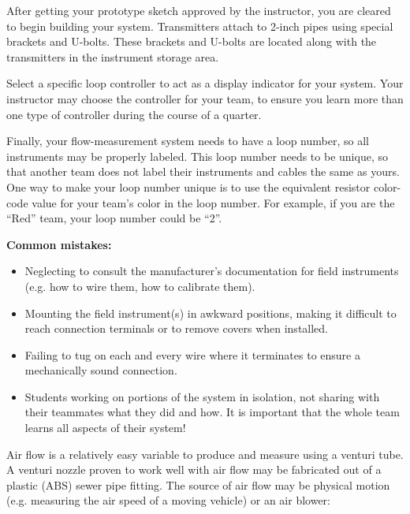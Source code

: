 \begin{itemize}
After getting your prototype sketch approved by the instructor, you are cleared to begin building your system.  Transmitters attach to 2-inch pipes using special brackets and U-bolts.  These brackets and U-bolts are located along with the transmitters in the instrument storage area.  

Select a specific loop controller to act as a display indicator for your system.  Your instructor may choose the controller for your team, to ensure you learn more than one type of controller during the course of a quarter.

Finally, your flow-measurement system needs to have a loop number, so all instruments may be properly labeled.  This loop number needs to be unique, so that another team does not label their instruments and cables the same as yours.  One way to make your loop number unique is to use the equivalent resistor color-code value for your team's color in the loop number.  For example, if you are the ``Red'' team, your loop number could be ``2''. 

\vskip 10pt

{\bf Common mistakes:}

\begin{itemize}
\item{} Neglecting to consult the manufacturer's documentation for field instruments (e.g. how to wire them, how to calibrate them).
\item{} Mounting the field instrument(s) in awkward positions, making it difficult to reach connection terminals or to remove covers when installed.
\item{} Failing to tug on each and every wire where it terminates to ensure a mechanically sound connection.
\item{} Students working on portions of the system in isolation, not sharing with their teammates what they did and how.  It is important that the whole team learns all aspects of their system!
\end{itemize}

\vfil \eject

Air flow is a relatively easy variable to produce and measure using a venturi tube.  A venturi nozzle proven to work well with air flow may be fabricated out of a plastic (ABS) sewer pipe fitting.  The source of air flow may be physical motion (e.g. measuring the air speed of a moving vehicle) or an air blower:


\end{itemize}

